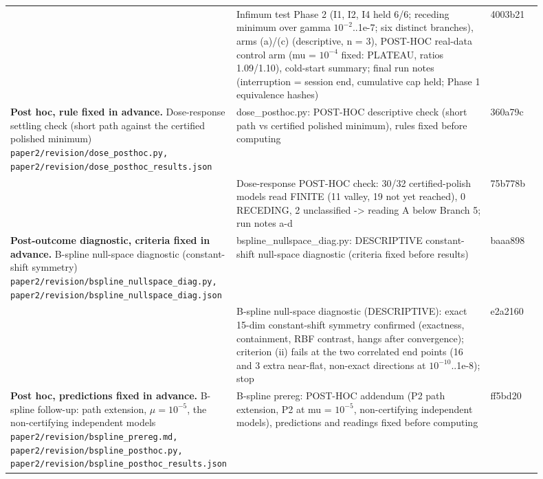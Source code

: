 {\begin{longtable}{R{0.28\linewidth} R{0.52\linewidth} R{0.10\linewidth}}
 & Infimum test Phase 2 (I1, I2, I4 held 6/6; receding minimum over gamma $10^{-2}$..1e-7; six distinct branches), arms (a)/(c) (descriptive, n = 3), POST-HOC real-data control arm (mu = $10^{-4}$ fixed: PLATEAU, ratios 1.09/1.10), cold-start summary; final run notes (interruption = session end, cumulative cap held; Phase 1 equivalence hashes) & 4003b21 \\
\textbf{Post hoc, rule fixed in advance.} Dose-response settling check (short path against the certified polished minimum) \newline \footnotesize{\texttt{paper2/\allowbreak{}revision/\allowbreak{}dose\_\allowbreak{}posthoc.py, paper2/\allowbreak{}revision/\allowbreak{}dose\_\allowbreak{}posthoc\_\allowbreak{}results.json}} & dose\_posthoc.py: POST-HOC descriptive check (short path vs certified polished minimum), rules fixed before computing & 360a79c \\
 & Dose-response POST-HOC check: 30/32 certified-polish models read FINITE (11 valley, 19 not yet reached), 0 RECEDING, 2 unclassified -> reading A below Branch 5; run notes a-d & 75b778b \\
\textbf{Post-outcome diagnostic, criteria fixed in advance.} B-spline null-space diagnostic (constant-shift symmetry) \newline \footnotesize{\texttt{paper2/\allowbreak{}revision/\allowbreak{}bspline\_\allowbreak{}nullspace\_\allowbreak{}diag.py, paper2/\allowbreak{}revision/\allowbreak{}bspline\_\allowbreak{}nullspace\_\allowbreak{}diag.json}} & bspline\_nullspace\_diag.py: DESCRIPTIVE constant-shift null-space diagnostic (criteria fixed before results) & baaa898 \\
 & B-spline null-space diagnostic (DESCRIPTIVE): exact 15-dim constant-shift symmetry confirmed (exactness, containment, RBF contrast, hangs after convergence); criterion (ii) fails at the two correlated end points (16 and 3 extra near-flat, non-exact directions at $10^{-10}$..1e-8); stop & e2a2160 \\
\textbf{Post hoc, predictions fixed in advance.} B-spline follow-up: path extension, $\mu = 10^{-5}$, the non-certifying independent models \newline \footnotesize{\texttt{paper2/\allowbreak{}revision/\allowbreak{}bspline\_\allowbreak{}prereg.md, paper2/\allowbreak{}revision/\allowbreak{}bspline\_\allowbreak{}posthoc.py, paper2/\allowbreak{}revision/\allowbreak{}bspline\_\allowbreak{}posthoc\_\allowbreak{}results.json}} & B-spline prereg: POST-HOC addendum (P2 path extension, P2 at mu = $10^{-5}$, non-certifying independent models), predictions and readings fixed before computing & ff5bd20 \\

\end{longtable}}
